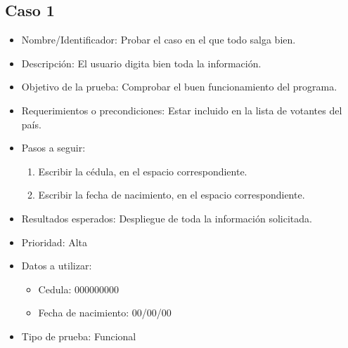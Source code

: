 \documentclass[conference]{IEEEtran}
\begin{document}
\subsection{Caso 1}
\begin{itemize}
\item Nombre/Identificador: Probar el caso en el que todo salga bien.
\item Descripción: El usuario digita bien toda la información.
\item Objetivo de la prueba: Comprobar el buen funcionamiento del programa.
\item Requerimientos o precondiciones: Estar incluido en la lista de votantes del país.
\item Pasos a seguir: 
\begin{enumerate}
\item Escribir la cédula, en el espacio correspondiente.
\item Escribir la fecha de nacimiento, en el espacio correspondiente.
\end{enumerate}
\item Resultados esperados: Despliegue de toda la información solicitada.
\item Prioridad: Alta
\item Datos a utilizar: 
\begin{itemize}
\item Cedula: 000000000
\item Fecha de nacimiento: 00/00/00
\end{itemize}
\item Tipo de prueba: Funcional
\end{itemize}
\end{document}
